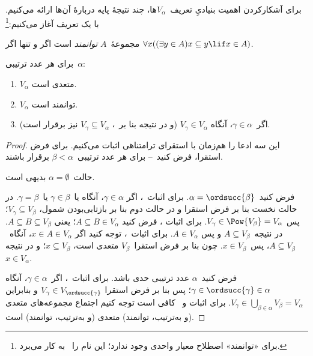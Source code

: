 \documentclass[../../../include/open-logic-section]{subfiles}
\begin{document}

برای آشکارکردن اهمیت بنیادیِ تعریف~$V_\alpha$ها، چند نتیجهٔ پایه دربارهٔ
آن‌ها ارائه می‌کنیم. با یک تعریف آغاز می‌کنیم:\footnote{برای «توانمند»
اصطلاح معیار واحدی وجود ندارد؛ این نام را~\citet{ButtonLT1} به کار
می‌برد.}
\begin{defn}
	مجموعهٔ~$A$ \emph{توانمند} است اگر و تنها اگر
	$\forall x((\exists y \in A)x \subseteq y \lif x \in A)$.
\end{defn}
\begin{lem}
برای هر عدد ترتیبی~$\alpha$:
\begin{enumerate}
	\item{} $V_\alpha$ متعدی است.
	\item{} $V_\alpha$ توانمند است.
	\item{} اگر~$\gamma\in\alpha$، آنگاه
	$V_\gamma\in V_\alpha$ (و در نتیجه بنا بر~،
	$V_\gamma\subseteq V_\alpha$ نیز برقرار است).
\end{enumerate}
\end{lem}

\begin{proof}
این سه ادعا را هم‌زمان با استقرای ترامتناهی اثبات می‌کنیم. برای فرض
استقرا، فرض کنید~-- برای هر عدد
ترتیبی~$\beta<\alpha$ برقرار باشند.

حالت~$\alpha=\emptyset$ بدیهی است.

فرض کنید~$\alpha=\ordsucc{\beta}$. برای اثبات~، اگر
$\gamma\in\alpha$، آنگاه یا~$\gamma\in\beta$ یا~$\gamma=\beta$.
در حالت نخست بنا بر فرض استقرا و در حالت دوم بنا بر بازتابی‌بودن شمول،
$V_\gamma\subseteq V_\beta$؛ پس
$V_\gamma\in\Pow{V_\beta}=V_\alpha$. برای اثبات
، فرض کنید
$A\subseteq B\in V_\alpha$؛ یعنی
$A\subseteq B\subseteq V_\beta$. در نتیجه~$A\subseteq V_\beta$ و پس
$A\in V_\alpha$. برای اثبات~، توجه کنید اگر
$x\in A\in V_\alpha$، آنگاه~$A\subseteq V_\beta$، پس~$x\in V_\beta$.
چون بنا بر فرض استقرا~$V_\beta$ متعدی است، $x\subseteq V_\beta$؛ و در
نتیجه~$x\in V_\alpha$.

فرض کنید~$\alpha$ عدد ترتیبی حدی باشد. برای اثبات~،
اگر~$\gamma\in\alpha$، آنگاه
$\gamma\in\ordsucc{\gamma}\in\alpha$؛ پس بنا بر فرض استقرا
$V_\gamma\in V_{\ordsucc{\gamma}}$ و بنابراین
$V_\gamma\in\bigcup_{\beta\in\alpha}V_\beta=V_\alpha$. برای اثبات
 و~ کافی است توجه کنیم اجتماع
مجموعه‌های متعدی (و به‌ترتیب، توانمند) متعدی (و به‌ترتیب، توانمند) است.
\end{proof}
\end{document}

